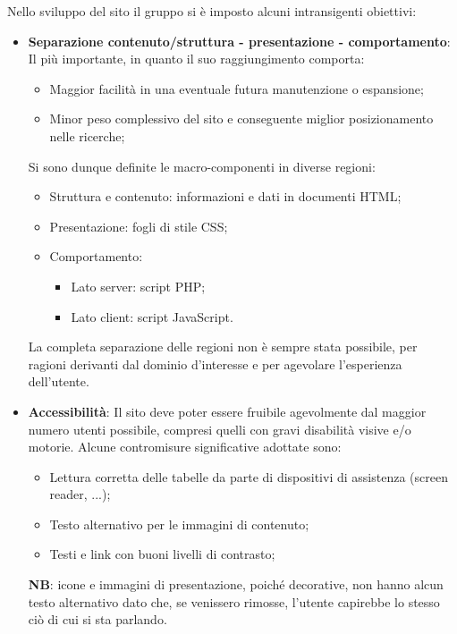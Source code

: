 Nello sviluppo del sito il gruppo si è imposto alcuni intransigenti obiettivi:
\begin{itemize}
    \item \textbf{Separazione contenuto/struttura - presentazione - comportamento}: Il più importante, in quanto il suo raggiungimento comporta:
	\begin{itemize}
	\item Maggior facilità in una eventuale futura manutenzione o espansione;
	\item Minor peso complessivo del sito e conseguente miglior posizionamento nelle ricerche;
	\end{itemize}	    

    Si sono dunque definite le macro-componenti in diverse regioni:
    \begin{itemize}
    	\item Struttura e contenuto: informazioni e dati in documenti HTML;
    	\item Presentazione: fogli di stile CSS;
    	\item Comportamento:
    		\begin{itemize}
    		\item Lato server: script PHP;
    		\item Lato client: script JavaScript.
    		\end{itemize}
	\end{itemize}    
	
	La completa separazione delle regioni non è sempre stata possibile, per ragioni derivanti dal dominio d'interesse e per agevolare l'esperienza dell'utente.	
	
   \item \textbf{Accessibilità}: Il sito deve poter essere fruibile agevolmente dal maggior numero utenti possibile, compresi quelli con gravi disabilità visive e/o
    motorie. Alcune contromisure significative adottate sono:
    \begin{itemize}
        \item Lettura corretta delle tabelle da parte di dispositivi di assistenza (screen reader, ...);
        \item Testo alternativo per le immagini di contenuto;
        \item Testi e link con buoni livelli di contrasto;
    \end{itemize}
    
    \textbf{NB}: icone e immagini di presentazione, poiché decorative, non hanno alcun testo alternativo dato che, se venissero rimosse, l'utente capirebbe lo stesso ciò di cui si sta parlando.
    

\end{itemize}
